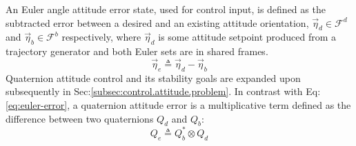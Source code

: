 An Euler angle attitude error state, used for control input, is defined as the subtracted error between a desired and an existing attitude orientation, $\vec{\eta}_d\in\mathcal{F}^d$ and $\vec{\eta}_b\in\mathcal{F}^b$ respectively, where $\vec{\eta}_d$ is some attitude setpoint produced from a trajectory generator and both Euler sets are in shared frames.
\begin{equation}\label{eq:euler-error}
\vec{\eta}_e\triangleq\vec{\eta}_d-\vec{\eta}_b
\end{equation}
Quaternion attitude control and its stability goals are expanded upon subsequently in Sec:\ref{subsec:control.attitude.problem}. In contrast with Eq:\ref{eq:euler-error}, a quaternion attitude error is a multiplicative term defined as the difference between two quaternions $Q_d$ and $Q_b$:
\begin{equation}\label{eq:quaternion-error}
Q_e\triangleq Q_b^*\otimes Q_d
\end{equation}
